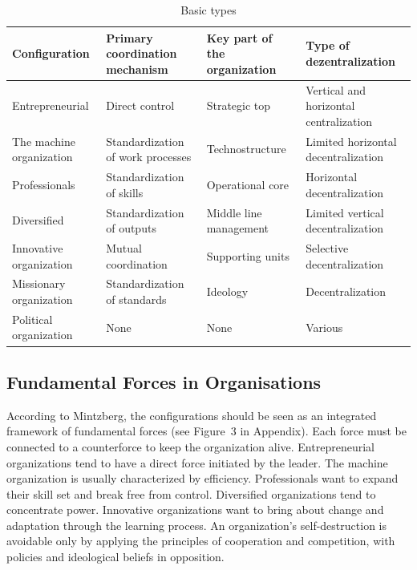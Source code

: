 \documentclass[a4paper,12pt]{article}
\begin{document}
\begin{table}[ht]
  \begin{tabular}{|p{3cm}|p{3.8cm}|p{3.8cm}|p{3.8cm}|}\hline
    Configuration & Primary coordination mechanism & Key part of the
    organization & Type of dezentralization \\\hline\hline

    Entrepreneurial & Direct control & Strategic top & Vertical and horizontal
    centralization\\ \hline

    The machine organization & Standardization of work processes &
    Technostructure & Limited horizontal decentralization \\ \hline
    
    Professionals & Standardization of skills & Operational core & Horizontal
    decentralization\\ \hline

    Diversified & Standardization of outputs & Middle line management &
    Limited vertical decentralization\\ \hline

    Innovative organization & Mutual coordination & Supporting units &
    Selective decentralization\\ \hline

    Missionary organization & Standardization of standards & Ideology &
    Decentralization\\ \hline

    Political organization & None & None & Various\\ \hline
\end{tabular}
\caption{Basic types \cite[p. 120]{Mintzberg}}
\label{Tab:types}
\end{table}

\subsection{Fundamental Forces in Organisations}

According to Mintzberg, the configurations should be seen as an integrated
framework of fundamental forces (see Figure~3 in Appendix). Each force must be
connected to a counterforce to keep the organization alive. Entrepreneurial
organizations tend to have a direct force initiated by the leader. The machine
organization is usually characterized by efficiency. Professionals want to
expand their skill set and break free from control. Diversified organizations
tend to concentrate power. Innovative organizations want to bring about change
and adaptation through the learning process. An organization's
self-destruction is avoidable only by applying the principles of cooperation
and competition, with policies and ideological beliefs in opposition.
\end{document}
